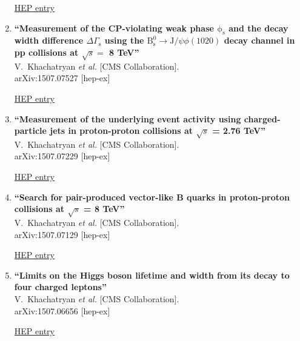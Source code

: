 \documentclass{article}
\begin{document}
\begin{enumerate}
\href{http://inspirehep.net/record/1385600}{HEP entry}


\item%
{\bf ``Measurement of the CP-violating weak phase $\mathrm{ \phi_s }$ and the decay width difference $ \Delta \Gamma_{ \mathrm{s} }$ using the $ \mathrm{B^0_s} \to \mathrm{J} / \psi \phi(1020) $ decay channel in pp collisions at $\sqrt{s} =$ 8 TeV''}
  \\{}V.~Khachatryan {\it et al.} [CMS Collaboration].
  \\{}arXiv:1507.07527 [hep-ex]
  
\href{http://inspirehep.net/record/1385111}{HEP entry}


\item%
{\bf ``Measurement of the underlying event activity using charged-particle jets in proton-proton collisions at $\sqrt{s}$ = 2.76 TeV''}
  \\{}V.~Khachatryan {\it et al.} [CMS Collaboration].
  \\{}arXiv:1507.07229 [hep-ex]
  
\href{http://inspirehep.net/record/1385107}{HEP entry}



\item%
{\bf ``Search for pair-produced vector-like B quarks in proton-proton collisions at $\sqrt{s}$ = 8 TeV''}
  \\{}V.~Khachatryan {\it et al.} [CMS Collaboration].
  \\{}arXiv:1507.07129 [hep-ex]
  
\href{http://inspirehep.net/record/1385104}{HEP entry}


\item%
{\bf ``Limits on the Higgs boson lifetime and width from its decay to four charged leptons''}
  \\{}V.~Khachatryan {\it et al.} [CMS Collaboration].
  \\{}arXiv:1507.06656 [hep-ex]
  
\href{http://inspirehep.net/record/1384772}{HEP entry}



\end{enumerate}
\end{document}
